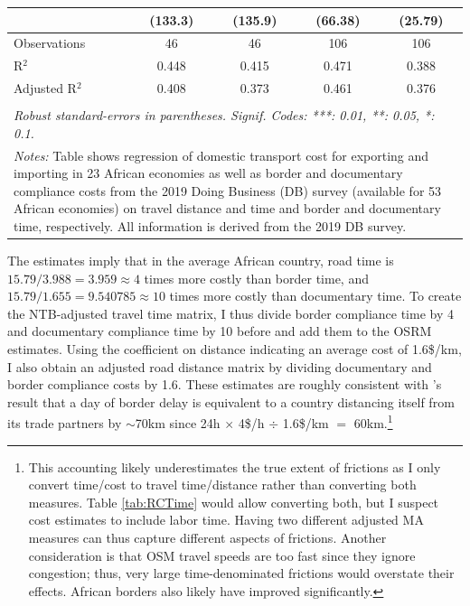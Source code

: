 \documentclass[a4paper]{article}
\begin{document}
\begin{table}[H]
\begin{tabular}{lcccc}
                                                   & (133.3)       & (135.9)       & (66.38)       & (25.79)\\   
      \midrule
      Observations                                 & 46            & 46            & 106           & 106\\  
      R$^2$                                        & 0.448       & 0.415       & 0.471       & 0.388\\  
      Adjusted R$^2$                               & 0.408       & 0.373       & 0.461       & 0.376\\  
      \bottomrule \\ [-0.9em]
      \multicolumn{5}{l}{\footnotesize \emph{Robust standard-errors in parentheses. Signif. Codes: ***: 0.01, **: 0.05, *: 0.1.}}\\ [0.4em]
      \multicolumn{5}{l}{\parbox{0.79\textwidth}{\scriptsize
\textit{Notes:} Table shows regression of domestic transport cost for exporting and importing in 23 African economies as well as border and documentary compliance costs from the 2019 Doing Business (DB) survey (available for 53 African economies) on travel distance and time and border and documentary time, respectively. All information is derived from the 2019 DB survey. \vspace{-1mm}}}      
      
   \end{tabular}
\end{table}

 The estimates imply that in the average African country, road time is $15.79/3.988 = 3.959 \approx 4$ times more costly than border time, and $15.79/1.655 = 9.540785 \approx 10$ times more costly than documentary time. To create the NTB-adjusted travel time matrix, I thus divide border compliance time by 4 and documentary compliance time by 10 before and add them to the OSRM estimates. Using the coefficient on distance indicating an average cost of 1.6\$/km, I also obtain an adjusted road distance matrix by dividing documentary and border compliance costs by 1.6. These estimates are roughly consistent with \citet{djankov2010trading}'s result that a day of border delay is equivalent to a country distancing itself from its trade partners by $\sim$70km since 24h $\times$ 4\$/h $\div$ 1.6\$/km $=$ 60km.\footnote{This accounting likely underestimates the true extent of frictions as I only convert time/cost to travel time/distance rather than converting both measures. Table \ref{tab:RCTime} would allow converting both, but I suspect cost estimates to include labor time. Having two different adjusted MA measures can thus capture different aspects of frictions. Another consideration is that OSM travel speeds are too fast since they ignore congestion; thus, very large time-denominated frictions would overstate their effects. African borders also likely have improved significantly. } \newline 
\end{document}
